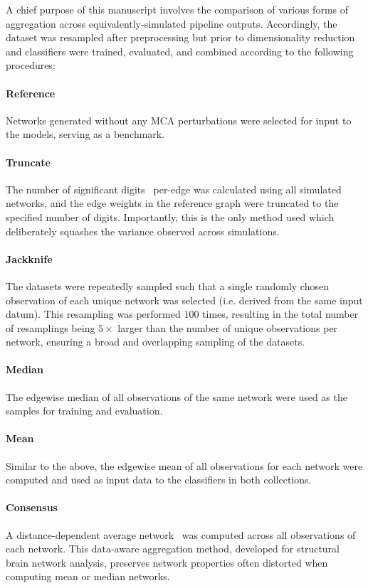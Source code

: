 \documentclass[num-refs]{nbdt-article}
\begin{document}
A chief purpose of this manuscript involves the comparison of various forms of aggregation across equivalently-simulated pipeline outputs. Accordingly, the dataset was resampled after preprocessing but prior to dimensionality reduction and classifiers were trained, evaluated, and combined according to the following procedures:

\paragraph{Reference} Networks generated without any MCA perturbations were selected for input to the models, serving as a benchmark.

\paragraph{Truncate} The number of significant digits~\cite{Parker1997-qq} per-edge was calculated using all simulated networks, and the edge weights in the reference graph were truncated to the specified number of digits. Importantly, this is the only method used which deliberately squashes the variance observed across simulations.

\paragraph{Jackknife} The datasets were repeatedly sampled such that a single randomly chosen observation of each unique network was selected (i.e. derived from the same input datum). This resampling was performed $100$ times, resulting in the total number of resamplings being $5\times$ larger than the number of unique observations per network, ensuring a broad and overlapping sampling of the datasets.

\paragraph{Median} The edgewise median of all observations of the same network were used as the samples for training and evaluation.

\paragraph{Mean} Similar to the above, the edgewise mean of all observations for each network were computed and used as input data to the classifiers in both collections.

\paragraph{Consensus} A distance-dependent average network~\cite{Betzel2018-eo} was computed across all observations of each network. This data-aware aggregation method, developed for structural brain network analysis, preserves network properties often distorted when computing mean or median networks.
\end{document}

